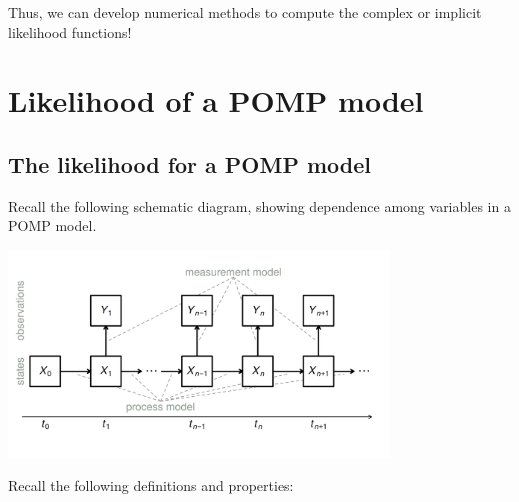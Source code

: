 \documentclass[
  letterpaper,
  DIV=11,
  numbers=noendperiod]{scrartcl}
\begin{document}
Thus, we can develop numerical methods to compute the complex or
implicit likelihood functions!

\hypertarget{likelihood-of-a-pomp-model}{%
\section{Likelihood of a POMP model}\label{likelihood-of-a-pomp-model}}

\hypertarget{the-likelihood-for-a-pomp-model}{%
\subsection{The likelihood for a POMP
model}\label{the-likelihood-for-a-pomp-model}}

Recall the following schematic diagram, showing dependence among
variables in a POMP model.

\begin{center}
    \includegraphics[height=5.5cm]{../graphics/lec3ll.png}
  \end{center}

\framebreak

Recall the following definitions and properties:
\end{document}
